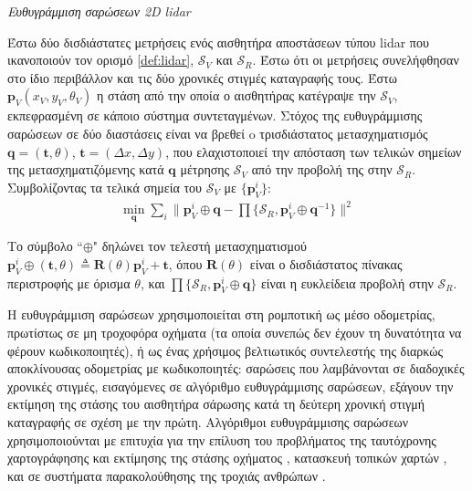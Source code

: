 \begin{bw_box}
\begin{definition}
\label{def:sm}
\textit{Ευθυγράμμιση σαρώσεων 2D lidar}

Έστω δύο δισδιάστατες μετρήσεις ενός αισθητήρα αποστάσεων τύπου lidar που
ικανοποιούν τον ορισμό \ref{def:lidar}, $\mathcal{S}_V$ και $\mathcal{S}_R$.
Έστω ότι οι μετρήσεις συνελήφθησαν στο ίδιο περιβάλλον και τις δύο χρονικές
στιγμές καταγραφής τους. Έστω $\bm{p}_V(x_V,y_V,\theta_V)$ η στάση από την
οποία ο αισθητήρας κατέγραψε την $\mathcal{S}_V$, εκπεφρασμένη σε κάποιο
σύστημα συντεταγμένων.  Στόχος της ευθυγράμμισης σαρώσεων σε δύο διαστάσεις
είναι να βρεθεί o τρισδιάστατος μετασχηματισμός $\bm{q} = (\bm{t}, \theta)$,
$\bm{t} = (\Delta x, \Delta y)$, που ελαχιστοποιεί την απόσταση των τελικών
σημείων της μετασχηματιζόμενης κατά $\bm{q}$ μέτρησης $\mathcal{S}_V$ από την
προβολή της στην $\mathcal{S}_R$.  Συμβολίζοντας τα τελικά σημεία του
$\mathcal{S}_V$ με $\{\bm{p}_V^i\}$:
\begin{align}
  \underset{\bm{q}}{\min} \sum\limits_i \Big\| \bm{p}_V^i \oplus \bm{q} - \prod \{ \mathcal{S}_R, \bm{p}_V^i \oplus \bm{q}^{-1} \}\Big\|^2
  \label{eq:sm_def}
\end{align}

Το σύμβολο ``$\oplus$" δηλώνει τον τελεστή μετασχηματισμού $\bm{p}_V^i \oplus
(\bm{t}, \theta) \triangleq \bm{R}(\theta) \bm{p}^i_V + \bm{t}$, όπου
$\bm{R}(\theta)$ είναι ο δισδιάστατος πίνακας περιστροφής με όρισμα
$\theta$, και $\prod\{\mathcal{S}_R, \bm{p}_V^i \oplus \bm{q} \}$ είναι η
ευκλείδεια προβολή στην $\mathcal{S}_R$.
\end{definition}
\end{bw_box}




\begin{gg_box}
\begin{remark}
\label{rem:sm_applications}
Η ευθυγράμμιση σαρώσεων χρησιμοποιείται στη ρομποτική ως μέσο οδομετρίας,
πρωτίστως σε μη τροχοφόρα οχήματα (τα οποία συνεπώς δεν έχουν τη δυνατότητα να
φέρουν κωδικοποιητές), ή ως ένας χρήσιμος βελτιωτικός συντελεστής της διαρκώς
αποκλίνουσας οδομετρίας με κωδικοποιητές: σαρώσεις που λαμβάνονται σε
διαδοχικές χρονικές στιγμές, εισαγόμενες σε αλγόριθμο ευθυγράμμισης
σαρώσεων, εξάγουν την εκτίμηση της στάσης του αισθητήρα σάρωσης κατά τη
δεύτερη χρονική στιγμή καταγραφής σε σχέση με την πρώτη. Αλγόριθμοι
ευθυγράμμισης σαρώσεων χρησιμοποιούνται με επιτυχία για την επίλυση του
προβλήματος της ταυτόχρονης χαρτογράφησης και εκτίμησης της στάσης οχήματος
\cite{Gutmann,Hahnel,Chieh-ChihWang}, κατασκευή τοπικών χαρτών
\cite{Lacroix2002a,Minguez,Montesano2008a}, και σε συστήματα παρακολούθησης της
τροχιάς ανθρώπων \cite{Schulz}.
\end{remark}
\end{gg_box}



